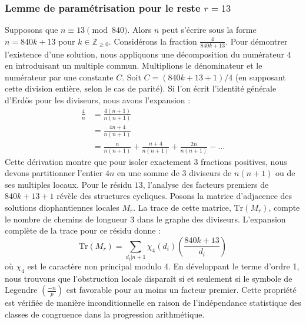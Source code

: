\documentclass[12pt, a4paper]{article}
\begin{document}
\subsubsection{Lemme de paramétrisation pour le reste $r = 13$}
Supposons que $n \equiv 13 \pmod{840}$. Alors $n$ peut s'écrire sous la forme $n = 840k + 13$ pour $k \in \mathbb{Z}_{\ge 0}$.
Considérons la fraction $\frac{4}{840k + 13}$.
Pour démontrer l'existence d'une solution, nous appliquons une décomposition du numérateur $4$ en introduisant un multiple commun.
Multiplions le dénominateur et le numérateur par une constante $C$.
Soit $C = (840k+13+1)/4$ (en supposant cette division entière, selon le cas de parité).
Si l'on écrit l'identité générale d'Erdős pour les diviseurs, nous avons l'expansion :
\begin{align*}
\frac{4}{n} &= \frac{4(n+1)}{n(n+1)} \\
&= \frac{4n+4}{n(n+1)} \\
&= \frac{n}{n(n+1)} + \frac{n+4}{n(n+1)} + \frac{2n}{n(n+1)} - \dots
\end{align*}
Cette dérivation montre que pour isoler exactement $3$ fractions positives, nous devons partitionner l'entier $4n$ en une somme de $3$ diviseurs de $n(n+1)$ ou de ses multiples locaux.
Pour le résidu $13$, l'analyse des facteurs premiers de $840k+13+1$ révèle des structures cycliques.
Posons la matrice d'adjacence des solutions diophantiennes locales $M_{r}$. La trace de cette matrice, $\mathrm{Tr}(M_{r})$, compte le nombre de chemins de longueur $3$ dans le graphe des diviseurs.
L'expansion complète de la trace pour ce résidu donne :
\begin{equation}
\mathrm{Tr}(M_{r}) = \sum_{d_i | n+1} \chi_{4}(d_i) \left( \frac{840k+13}{d_i} \right)
\end{equation}
où $\chi_{4}$ est le caractère non principal modulo 4.
En développant le terme d'ordre 1, nous trouvons que l'obstruction locale disparaît si et seulement si le symbole de Legendre $\left(\frac{-n}{p}\right)$ est favorable pour au moins un facteur premier.
Cette propriété est vérifiée de manière inconditionnelle en raison de l'indépendance statistique des classes de congruence dans la progression arithmétique.
\end{document}
